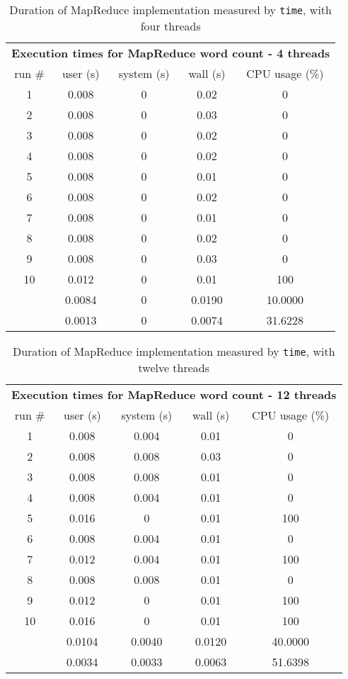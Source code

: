 \documentclass[12pt, letterpaper]{article}
\begin{document}
	\begin{table}[h]
	\centering
	\begin{tabular}{ccccc}
	\multicolumn{5}{c}{\cellcolor[HTML]{FFFFC7}\textbf{Execution times for MapReduce word count - 4 threads}} \\
	\cellcolor[HTML]{EFEFEF}run \# & \cellcolor[HTML]{EFEFEF}user (s) & \cellcolor[HTML]{EFEFEF}system (s) & 				\cellcolor[HTML]{EFEFEF}wall (s) & \cellcolor[HTML]{EFEFEF}CPU usage (\%) \\
	1 & 0.008 & 0 & 0.02 & 0 \\
	2 & 0.008 & 0 & 0.03 & 0 \\
	3 & 0.008 & 0 & 0.02 & 0 \\
	4 & 0.008 & 0 & 0.02 & 0 \\
	5 & 0.008 & 0 & 0.01 & 0 \\
	6 & 0.008 & 0 & 0.02 & 0 \\
	7 & 0.008 & 0 & 0.01 & 0 \\
	8 & 0.008 & 0 & 0.02 & 0 \\
	9 & 0.008 & 0 & 0.03 & 0 \\
	10 & 0.012 & 0 & 0.01 & 100 \\
	\rowcolor[HTML]{D0F0D0} 
	\multicolumn{1}{r}{\cellcolor[HTML]{9AFF99}mean (s)} & 0.0084 & 0 & 0.0190 & 10.0000 \\
	\rowcolor[HTML]{ECF4FF} 
	\multicolumn{1}{r}{\cellcolor[HTML]{DAE8FC}std. dev. (s)} & 0.0013 & 0 & 0.0074 & 31.6228
	\end{tabular}
	\caption{Duration of MapReduce implementation measured by \texttt{time}, with four threads}
	\end{table}

	\begin{table}[h]
	\centering
	\begin{tabular}{ccccc}
	\multicolumn{5}{c}{\cellcolor[HTML]{FFFFC7}\textbf{Execution times for MapReduce word count - 12 threads}} \\
	\rowcolor[HTML]{EFEFEF} 
	run \# & user (s) & system (s) & wall (s) & CPU usage (\%) \\
	1 & 0.008 & 0.004 & 0.01 & 0 \\
	2 & 0.008 & 0.008 & 0.03 & 0 \\
	3 & 0.008 & 0.008 & 0.01 & 0 \\
	4 & 0.008 & 0.004 & 0.01 & 0 \\
	5 & 0.016 & 0 & 0.01 & 100 \\
	6 & 0.008 & 0.004 & 0.01 & 0 \\
	7 & 0.012 & 0.004 & 0.01 & 100 \\
	8 & 0.008 & 0.008 & 0.01 & 0 \\
	9 & 0.012 & 0 & 0.01 & 100 \\
	10 & 0.016 & 0 & 0.01 & 100 \\
	\rowcolor[HTML]{D0F0D0} 
	\multicolumn{1}{r}{\cellcolor[HTML]{9AFF99}mean (s)} & 0.0104 & 0.0040 & 0.0120 & 40.0000 \\
	\rowcolor[HTML]{ECF4FF} 
	\multicolumn{1}{r}{\cellcolor[HTML]{DAE8FC}std. dev. (s)} & 0.0034 & 0.0033 & 0.0063 & 51.6398
	\end{tabular}
	\caption{Duration of MapReduce implementation measured by \texttt{time}, with twelve threads}
	\end{table}
\end{document}
